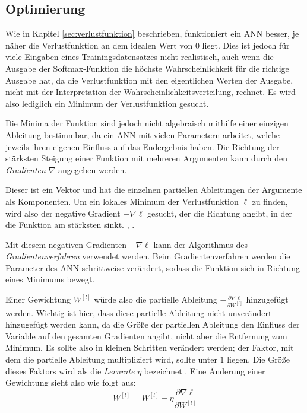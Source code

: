 \documentclass[12pt,titlepage]{article}
\begin{document}
\subsection{Optimierung} \label{sec:optimierung}

Wie in Kapitel \ref{sec:verlustfunktion} beschrieben, funktioniert ein ANN besser, je näher die Verlustfunktion an dem idealen Wert von $0$ liegt. Dies ist jedoch für viele Eingaben eines Trainingsdatensatzes nicht realistisch, auch wenn die Ausgabe der Softmax-Funktion die höchste Wahrscheinlichkeit für die richtige Ausgabe hat, da die Verlustfunktion mit den eigentlichen Werten der Ausgabe, nicht mit der Interpretation der Wahrscheinlichkeitsverteilung, rechnet. Es wird also lediglich ein Minimum der Verlustfunktion gesucht.

\newpage

Die Minima der Funktion sind jedoch nicht algebraisch mithilfe einer einzigen Ableitung bestimmbar, da ein ANN mit vielen Parametern arbeitet, welche jeweils ihren eigenen Einfluss auf das Endergebnis haben. Die Richtung der stärksten Steigung einer Funktion mit mehreren Argumenten kann durch den \textit{Gradienten} $\nabla$ angegeben werden.

Dieser ist ein Vektor und hat die einzelnen partiellen Ableitungen der Argumente als Komponenten. Um ein lokales Minimum der Verlustfunktion $\ell$ zu finden, wird also der negative Gradient $-\nabla \ell$ gesucht, der die Richtung angibt, in der die Funktion am stärksten sinkt. \autocite[Kapitel 2]{sanderson3Blue1Brown}, \autocite[3]{lecunTheoreticalFrameworkBackpropagation1988}.

Mit diesem negativen Gradienten \(-\nabla \ell\) kann der Algorithmus des \textit{Gradientenverfahren} verwendet werden. Beim Gradientenverfahren werden die Parameter des ANN schrittweise verändert, sodass die Funktion sich in Richtung eines Minimums bewegt.

Einer Gewichtung \(W^{[l]}\) würde also die partielle Ableitung \(- \frac{\partial \nabla \ell}{\partial W^{[l]}}\) hinzugefügt werden. Wichtig ist hier, dass diese partielle Ableitung nicht unverändert hinzugefügt werden kann, da die Größe der partiellen Ableitung den Einfluss der Variable auf den gesamten Gradienten angibt, nicht aber die Entfernung zum Minimum. Es sollte also in kleinen Schritten verändert werden; der Faktor, mit dem die partielle Ableitung multipliziert wird, sollte unter $1$ liegen. Die Größe dieses Faktors wird als die \textit{Lernrate} \(\eta\) bezeichnet \autocite[Kapitel 2]{sanderson3Blue1Brown}. Eine Änderung einer Gewichtung sieht also wie folgt aus:
\[
  W^{[l]} = W^{[l]} - \eta \frac{\partial \nabla \ell}{\partial W^{[l]}}
\]
\end{document}
